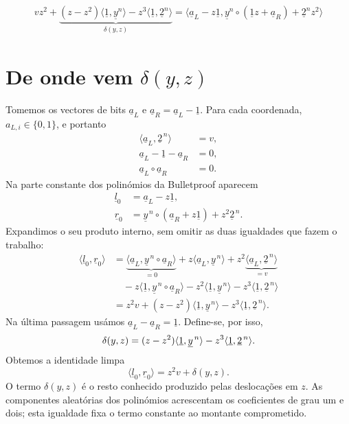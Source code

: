 \begin{appendices}
\begin{align*}
vz^2 + \underbrace{(z - z^2)\langle \underline{1}, \underline{y}^n \rangle - z^3 \langle \underline{1}, \underline{2}^n\rangle}_{\delta(y,z)} = \langle\underline{a}_L - z\underline{1}, \underline{y}^n \circ (\underline{1}z + \underline{a}_R) + \underline{2}^n z^2 \rangle
\end{align*}
\fi

\section*{De onde vem \(\delta(y,z)\)}

Tomemos os vectores de bits \(\underline a_L\) e
\(\underline a_R=\underline a_L-\underline1\). Para cada coordenada,
\(a_{L,i}\in\{0,1\}\), e portanto
\begin{align}
 \langle\underline a_L,\underline2^{\,n}\rangle&=v,
 \label{eq:appendix-bp-value}\\
 \underline a_L-\underline1-\underline a_R&=0,
 \label{eq:appendix-bp-shift}\\
 \underline a_L\circ\underline a_R&=0.
 \label{eq:appendix-bp-bits}
\end{align}
Na parte constante dos polinómios da Bulletproof aparecem
\begin{align*}
 \underline l_0&=\underline a_L-z\underline1,\\
 \underline r_0&=
   \underline y^{\,n}\circ(\underline a_R+z\underline1)
   +z^2\underline2^{\,n}.
\end{align*}
Expandimos o seu produto interno, sem omitir as duas igualdades que fazem o
trabalho:
\begin{align*}
 \langle\underline l_0,\underline r_0\rangle
 &=\underbrace{\langle\underline a_L,
       \underline y^{\,n}\circ\underline a_R\rangle}_{=0}
   +z\langle\underline a_L,\underline y^{\,n}\rangle
   +z^2\underbrace{\langle\underline a_L,
       \underline2^{\,n}\rangle}_{=v}\\
 &\quad-z\langle\underline1,
       \underline y^{\,n}\circ\underline a_R\rangle
   -z^2\langle\underline1,\underline y^{\,n}\rangle
   -z^3\langle\underline1,\underline2^{\,n}\rangle\\
 &=z^2v+(z-z^2)\langle\underline1,\underline y^{\,n}\rangle
       -z^3\langle\underline1,\underline2^{\,n}\rangle.
\end{align*}
Na última passagem usámos
\(\underline a_L-\underline a_R=\underline1\). Define-se, por isso,
\begin{align}
 \delta(y,z)
   =(z-z^2)\langle\underline1,\underline y^{\,n}\rangle
    -z^3\langle\underline1,\underline2^{\,n}\rangle.
 \label{eq:appendix-bp-delta}
\index{delta yz@\(\delta(y,z)\), correcção de Bulletproofs}
\end{align}
Obtemos a identidade limpa
\[
 \langle\underline l_0,\underline r_0\rangle=z^2v+\delta(y,z).
\]
O termo \(\delta(y,z)\) é o resto conhecido produzido pelas deslocações
em \(z\). As componentes aleatórias dos
polinómios acrescentam os coeficientes de grau um e dois; esta igualdade fixa
o termo constante ao montante comprometido.



\end{appendices}
